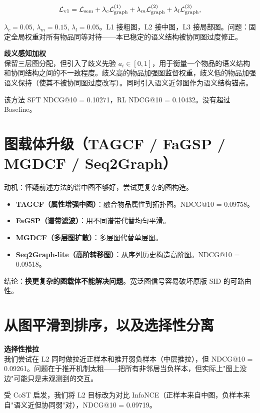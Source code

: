 \documentclass[11pt]{article}
\begin{document}
\[
\mathcal{L}_{\rm v1} = \mathcal{L}_{\rm sem} + \lambda_c\mathcal{L}_{\rm graph}^{(1)} + \lambda_m\mathcal{L}_{\rm graph}^{(2)} + \lambda_l\mathcal{L}_{\rm graph}^{(3)},
\]

$\lambda_c=0.05$, $\lambda_m=0.15$, $\lambda_l=0.05$。L1 接粗图，L2 接中图，L3 接局部图。问题：固定全局权重对所有物品同等对待——本已稳定的语义结构被协同图过度修正。

\medskip
\textbf{歧义感知加权}\\
保留三层图分配，但引入了歧义先验 $a_i \in [0,1]$，用于衡量一个物品的语义结构和协同结构之间的不一致程度。歧义高的物品加强图监督权重，歧义低的物品加强语义保持（使其不被协同图过度改写）。同时引入语义近邻图作为语义结构锚点。

该方法 SFT NDCG@10 = 0.10271，RL NDCG@10 = 0.10432。没有超过 Baseline。

\section{图载体升级（TAGCF / FaGSP / MGDCF / Seq2Graph）}

动机：怀疑前述方法的谱中图不够好，尝试更复杂的图构造。

\begin{itemize}
  \item \textbf{TAGCF（属性增强中图）}：融合物品属性到拓扑图。NDCG@10 = 0.09758。
  \item \textbf{FaGSP（谱带滤波）}：用不同谱带代替均匀平滑。
  \item \textbf{MGDCF（多层图扩散）}：多层图代替单层图。
  \item \textbf{Seq2Graph-lite（高阶转移图）}：从序列历史构造高阶图。NDCG@10 = 0.09518。
\end{itemize}

结论：\textbf{换更复杂的图载体不能解决问题}。宽泛图信号容易破坏原版 SID 的可路由性。

\section{从图平滑到排序，以及选择性分离}

\medskip
\textbf{选择性推拉}\\
我们尝试在 L2 同时做拉近正样本和推开弱负样本（中层推拉），但 NDCG@10 = 0.09261。问题在于推开机制太粗——把所有非邻居当负样本，但实际上"图上没边"可能只是未观测到的交互。

受 CoST 启发，我们将 L2 目标改为对比 InfoNCE（正样本来自中图，负样本来自"语义近但协同弱"对），NDCG@10 = 0.09719。
\end{document}
